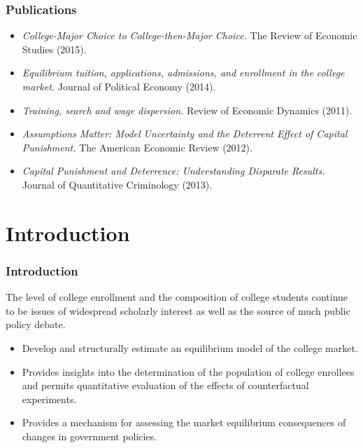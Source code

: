 \documentclass[10pt]{beamer}
\begin{document}
\begin{frame}[c]\frametitle{Publications}

\begin{itemize}
    \small
    \item \textit{College-Major Choice to College-then-Major Choice.} The Review of Economic Studies (2015).
    \item \alert{\textit{Equilibrium tuition, applications, admissions, and enrollment in the college market.} Journal of Political Economy (2014).}
    \item \textit{Training, search and wage dispersion.} Review of Economic Dynamics (2011).
    \item \textit{Assumptions Matter: Model Uncertainty and the Deterrent Effect of Capital Punishment.} The American Economic Review (2012).
    \item \textit{Capital Punishment and Deterrence: Understanding Disparate Results.} Journal of Quantitative Criminology (2013).
\end{itemize}


\end{frame}
\section{Introduction}

\begin{frame}[c]\frametitle{Introduction}

The level of \alert{college enrollment} and the \alert{composition of college students} continue to be issues of widespread scholarly interest as well as the source of much public policy debate.

\begin{itemize}
    \item Develop and structurally estimate an equilibrium model of the college market.
    \item Provides insights into the determination of the population of \alert{college enrollees} and permits quantitative evaluation of the effects of \alert{counterfactual experiments}.
    \item Provides a mechanism for assessing the market equilibrium consequences of changes in government policies.
\end{itemize}

\end{frame}
\end{document}
